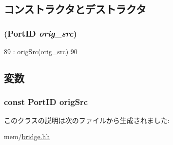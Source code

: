 \subsection{コンストラクタとデストラクタ}
\hypertarget{classBridge_1_1RequestState_ab4bed3856376340b350fdbb41426b6bf}{
\subsubsection[{RequestState}]{ ({\bf PortID} {\em orig\_\-src})}}
\label{classBridge_1_1RequestState_ab4bed3856376340b350fdbb41426b6bf}



\begin{DoxyCode}
89                                       : origSrc(orig_src)
90         { }
\end{DoxyCode}


\subsection{変数}
\hypertarget{classBridge_1_1RequestState_a1bef1751da1364a39c90d19004b816a0}{
\subsubsection[{origSrc}]{\setlength{\rightskip}{0pt plus 5cm}const {\bf PortID} {\bf origSrc}}}
\label{classBridge_1_1RequestState_a1bef1751da1364a39c90d19004b816a0}


このクラスの説明は次のファイルから生成されました:\begin{DoxyCompactItemize}
\item 
mem/\hyperlink{bridge_8hh}{bridge.hh}\end{DoxyCompactItemize}
